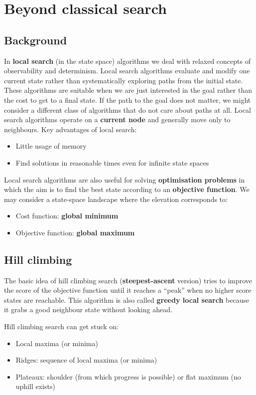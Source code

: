 \documentclass[a4paper, 11pt]{article}
\begin{document}
\section{Beyond classical search}

\subsection{Background}
In \textbf{local search} (in the state space) algorithms we deal with relaxed concepts of observability and determinism. Local search algorithms evaluate and modify one current state rather than systematically exploring paths from the initial state. These algorithms are suitable when we are just interested in the goal rather than the cost to get to a final state. If the path to the goal does not matter, we might consider a different class of algorithms that do not care about paths at all.
Local search algorithms operate on a \textbf{current node} and generally move only to neighbours.
Key advantages of local search:
\begin{itemize}
  \item Little usage of memory
  \item Find solutions in reasonable times even for infinite state spaces
\end{itemize}

Local search algorithms are also useful for solving \textbf{optimisation problems} in which the aim is to find the best state according to an \textbf{objective function}.
We may consider a state-space landscape where the elevation corresponds to:
\begin{itemize}
  \item Cost function: \textbf{global minimum}
  \item Objective function: \textbf{global maximum}
\end{itemize}

\subsection*{Hill climbing}
The basic idea of hill climbing search (\textbf{steepest-ascent} version) tries to improve the score of the objective function until it reaches a ``peak'' when no higher score states are reachable.
This algorithm is also called \textbf{greedy local search} because it grabs a good neighbour state without looking ahead.

Hill climbing search can get stuck on:
\begin{itemize}
  \item Local maxima (or minima)
  \item Ridges: sequence of local maxima (or minima)
  \item Plateaux: shoulder (from which progress is possible) or flat maximum (no uphill exists)
\end{itemize}
\end{document}
